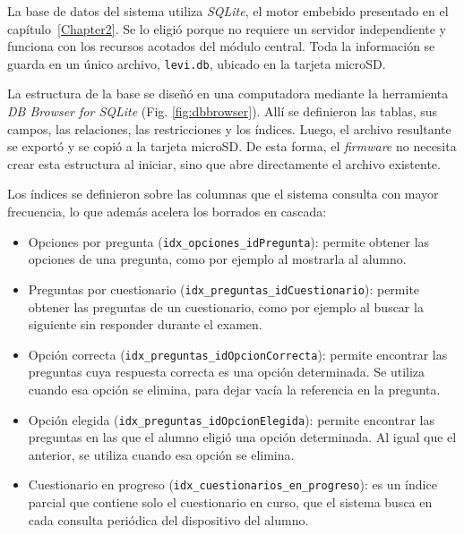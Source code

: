La base de datos del sistema utiliza \emph{SQLite}, el motor embebido presentado en el capítulo~\ref{Chapter2}. Se lo eligió porque no requiere un servidor independiente y funciona con los recursos acotados del módulo central. Toda la información se guarda en un único archivo, \texttt{levi.db}, ubicado en la tarjeta microSD.

La estructura de la base se diseñó en una computadora mediante la herramienta \emph{DB Browser for SQLite} (Fig. \ref{fig:dbbrowser}). Allí se definieron las tablas, sus campos, las relaciones, las restricciones y los índices. Luego, el archivo resultante se exportó y se copió a la tarjeta microSD. De esta forma, el \emph{firmware} no necesita crear esta estructura al iniciar, sino que abre directamente el archivo existente.

Los índices se definieron sobre las columnas que el sistema consulta con mayor frecuencia, lo que además acelera los borrados en cascada:

\begin{itemize}

\item Opciones por pregunta (\texttt{idx\_opciones\_idPregunta}): permite obtener las opciones de una pregunta, como por ejemplo al mostrarla al alumno.

\item Preguntas por cuestionario (\texttt{idx\_preguntas\_idCuestionario}): permite obtener las preguntas de un cuestionario, como por ejemplo al buscar la siguiente sin responder durante el examen.

\item Opción correcta (\texttt{idx\_preguntas\_idOpcionCorrecta}): permite encontrar las preguntas cuya respuesta correcta es una opción determinada. Se utiliza cuando esa opción se elimina, para dejar vacía la referencia en la pregunta.

\item Opción elegida (\texttt{idx\_preguntas\_idOpcionElegida}): permite encontrar las preguntas en las que el alumno eligió una opción determinada. Al igual que el anterior, se utiliza cuando esa opción se elimina.

\item Cuestionario en progreso (\texttt{idx\_cuestionarios\_en\_progreso}): es un índice parcial que contiene solo el cuestionario en curso, que el sistema busca en cada consulta periódica del dispositivo del alumno.

\end{itemize}

